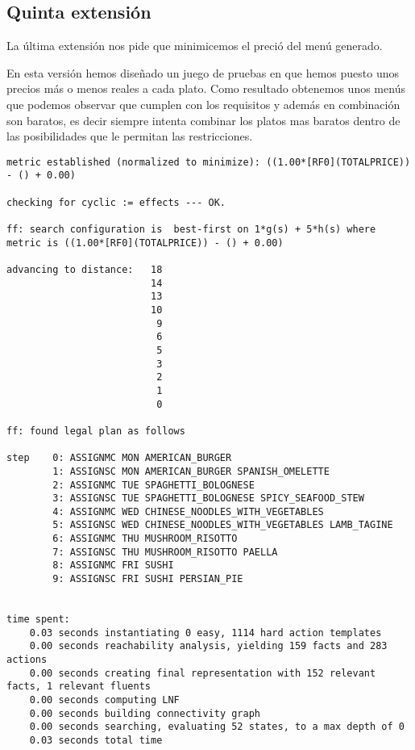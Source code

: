 \documentclass{article}
\begin{document}
\subsection{Quinta extensión}
La última extensión nos pide que minimicemos el preció del menú generado.
\par
En esta versión hemos diseñado un juego de pruebas en que hemos puesto unos precios más o menos reales a cada plato. Como resultado obtenemos unos menús que podemos observar que cumplen con los requisitos y además en combinación son baratos, es decir siempre intenta combinar los platos mas  baratos dentro de las posibilidades que le permitan las restricciones.
\begin{lstlisting}[language=none]
metric established (normalized to minimize): ((1.00*[RF0](TOTALPRICE)) - () + 0.00)

checking for cyclic := effects --- OK.

ff: search configuration is  best-first on 1*g(s) + 5*h(s) where metric is ((1.00*[RF0](TOTALPRICE)) - () + 0.00)

advancing to distance:   18
                         14
                         13
                         10
                          9
                          6
                          5
                          3
                          2
                          1
                          0

ff: found legal plan as follows

step    0: ASSIGNMC MON AMERICAN_BURGER
        1: ASSIGNSC MON AMERICAN_BURGER SPANISH_OMELETTE
        2: ASSIGNMC TUE SPAGHETTI_BOLOGNESE
        3: ASSIGNSC TUE SPAGHETTI_BOLOGNESE SPICY_SEAFOOD_STEW
        4: ASSIGNMC WED CHINESE_NOODLES_WITH_VEGETABLES
        5: ASSIGNSC WED CHINESE_NOODLES_WITH_VEGETABLES LAMB_TAGINE
        6: ASSIGNMC THU MUSHROOM_RISOTTO
        7: ASSIGNSC THU MUSHROOM_RISOTTO PAELLA
        8: ASSIGNMC FRI SUSHI
        9: ASSIGNSC FRI SUSHI PERSIAN_PIE


time spent:
    0.03 seconds instantiating 0 easy, 1114 hard action templates
    0.00 seconds reachability analysis, yielding 159 facts and 283 actions
    0.00 seconds creating final representation with 152 relevant facts, 1 relevant fluents
    0.00 seconds computing LNF
    0.00 seconds building connectivity graph
    0.00 seconds searching, evaluating 52 states, to a max depth of 0
    0.03 seconds total time
\end{lstlisting}
\end{document}
